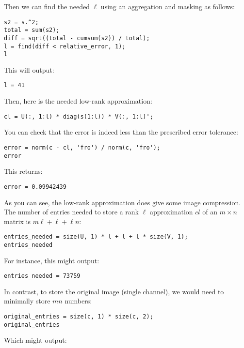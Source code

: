 \documentclass{ximera}
\begin{document}
\begin{problem}
\begin{problem}
Then we can find the needed \( \ell \) using an aggregation and masking as follows:

\begin{verbatim}
s2 = s.^2;
total = sum(s2);
diff = sqrt((total - cumsum(s2)) / total);
l = find(diff < relative_error, 1);
l
\end{verbatim}

This will output:

\begin{verbatim}
l = 41
\end{verbatim}

Then, here is the needed low-rank approximation:

\begin{verbatim}
cl = U(:, 1:l) * diag(s(1:l)) * V(:, 1:l)';
\end{verbatim}

You can check that the error is indeed less than the prescribed error tolerance:

\begin{verbatim}
error = norm(c - cl, 'fro') / norm(c, 'fro');
error
\end{verbatim}

This returns:

\begin{verbatim}
error = 0.09942439
\end{verbatim}

As you can see, the low-rank approximation does give some image compression. The number of entries needed to store a rank \( \ell \) approximation \( cl \) of an \( m \times n \) matrix is \( m\ell + \ell + \ell n \):

\begin{verbatim}
entries_needed = size(U, 1) * l + l + l * size(V, 1);
entries_needed
\end{verbatim}

For instance, this might output:

\begin{verbatim}
entries_needed = 73759
\end{verbatim}

In contrast, to store the original image (single channel), we would need to minimally store \( mn \) numbers:

\begin{verbatim}
original_entries = size(c, 1) * size(c, 2);
original_entries
\end{verbatim}

Which might output:


\end{problem}
\end{problem}
\end{document}
